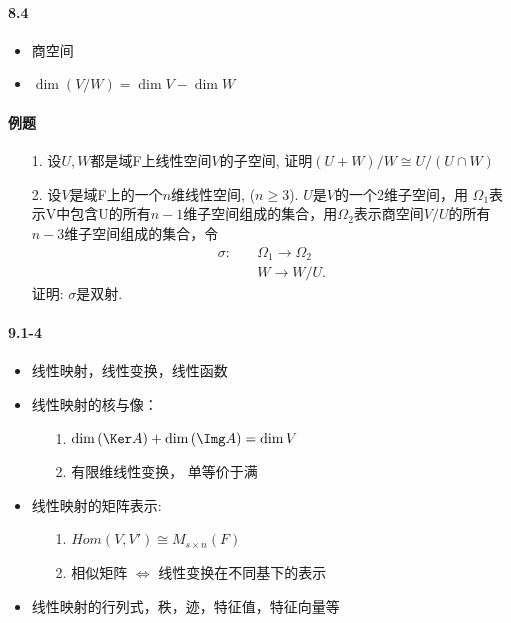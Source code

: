 \paragraph{8.4}
\begin{itemize}
    \item 商空间
    \item $\dim{(V/W)} = \dim V - \dim W$
\end{itemize}

\paragraph{例题}
\begin{itemize}
    \item [1.] 设$U,W$都是域F上线性空间$V$的子空间, 证明$(U+W)/W \cong U/(U\cap W)$
    \vspace{2cm}
    \item [2.] 设$V$是域F上的一个$n$维线性空间, ($n\ge 3$). $U$是$V$的一个2维子空间，用
    $\Omega_1$表示V中包含U的所有$n-1$维子空间组成的集合，用$\Omega_2$表示商空间$V/U$的所有
    $n-3$维子空间组成的集合，令
    \begin{equation}
        \nonumber
        \begin{aligned}
        \sigma:\quad &\Omega_1 \longrightarrow \Omega_2\\
                     & W \longrightarrow W/U.
        \end{aligned}
    \end{equation}
    证明: $\sigma$是双射.
    \vspace{3cm}
\end{itemize}

\paragraph{9.1-4}
\begin{itemize}
    \item 线性映射，线性变换，线性函数
    \item 线性映射的核与像：
    \begin{itemize}
        \item[1.] $\dim{(\Ker A)} + \dim{(\Img A)} = \dim{V}$
        \item[2.] 有限维线性变换， 单等价于满
    \end{itemize}
    \item 线性映射的矩阵表示:
    \begin{itemize}
        \item[1.] $Hom(V,V') \cong M_{s \times n}(F)$
        \item[2.] 相似矩阵 $\Longleftrightarrow$ 线性变换在不同基下的表示 
    \end{itemize}
    \item 线性映射的行列式，秩，迹，特征值，特征向量等
\end{itemize}

